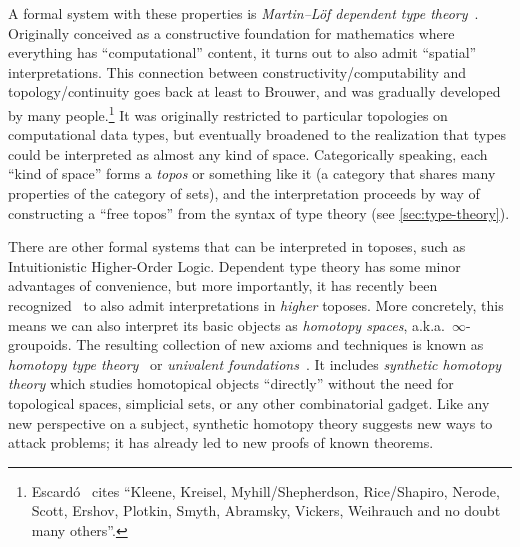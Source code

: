 \documentclass[10pt]{article}
\def\oo{\ensuremath{\infty}}
\numberwithin{equation}{section}
\begin{document}
A formal system with these properties is \emph{Martin--L\"{o}f dependent type theory}~\cite{martinlof:itt-pred,martinlof:itt}.
Originally conceived as a constructive foundation for mathematics where everything has ``computational'' content, it turns out to also admit ``spatial'' interpretations. %
This connection between constructivity/computability and topology/continuity goes back at least to Brouwer, and was gradually developed by many people.\footnote{Escard\'o~\cite{escardo:syntop-datatypes} cites ``Kleene, Kreisel, Myhill/Shepherdson, Rice/Shapiro, Nerode, Scott, Ershov, Plotkin, Smyth, Abramsky, Vickers, Weihrauch and no doubt many others''.}
It was originally restricted to particular topologies on computational data types, but eventually broadened to the realization that types could be interpreted as almost any kind of space. %
Categorically speaking, each ``kind of space'' forms a \emph{topos} or something like it (a category that shares many properties of the category of sets), and the interpretation proceeds by way of constructing a ``free topos'' from the syntax of type theory (see \cref{sec:type-theory}).

There are other formal systems that can be interpreted in toposes, such as Intuitionistic Higher-Order Logic.
Dependent type theory has some minor advantages of convenience, but more importantly, it has recently been recognized~\cite{aw:htpy-idtype,klv:ssetmodel} to also admit interpretations in \emph{higher} toposes.
More concretely, this means we can also interpret its basic objects as \emph{homotopy spaces}, a.k.a.\ \oo-groupoids.
The resulting collection of new axioms and techniques is known as \emph{homotopy type theory}~\cite{hottbook} or \emph{univalent foundations}~\cite{vv:unimath}.
It includes \emph{synthetic homotopy theory} which studies homotopical objects ``directly'' without the need for topological spaces, simplicial sets, or any other combinatorial gadget.
Like any new perspective on a subject, synthetic homotopy theory suggests new ways to attack problems; it has already led to new proofs of known theorems.
\end{document}
